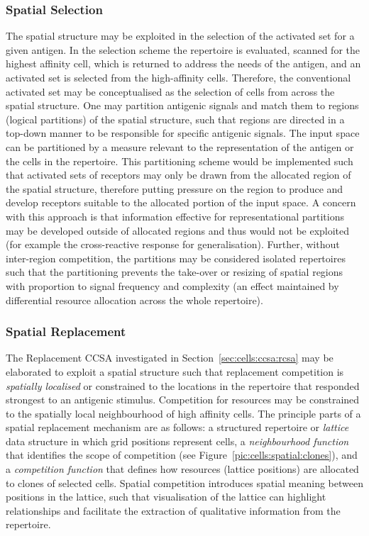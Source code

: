 %
%
\subsubsection{Spatial Selection}
The spatial structure may be exploited in the selection of the activated set for a given antigen. In the selection scheme the repertoire is evaluated, scanned for the highest affinity cell, which is returned to address the needs of the antigen, and an activated set is selected from the high-affinity cells. Therefore, the conventional activated set may be conceptualised as the selection of cells from across the spatial structure. 
One may partition antigenic signals and match them to regions (logical partitions) of the spatial structure, such that regions are directed in a top-down manner to be responsible for specific antigenic signals. The input space can be partitioned by a measure relevant to the representation of the antigen or the cells in the repertoire. This partitioning scheme would be implemented such that activated sets of receptors may only be drawn from the allocated region of the spatial structure, therefore putting pressure on the region to produce and develop receptors suitable to the allocated portion of the input space. A concern with this approach is that information effective for representational partitions may be developed outside of allocated regions and thus would not be exploited (for example the cross-reactive response for generalisation). Further, without inter-region competition, the partitions may be considered isolated repertoires such that the partitioning prevents the take-over or resizing of spatial regions with proportion to signal frequency and complexity (an effect maintained by differential resource allocation across the whole repertoire). 

%
%
\subsubsection{Spatial Replacement}
The Replacement CCSA investigated in Section~\ref{sec:cells:ccsa:rcsa} may be elaborated to exploit a spatial structure such that replacement competition is \emph{spatially localised} or constrained to the locations in the repertoire that responded strongest to an antigenic stimulus. Competition for resources may be constrained to the spatially local neighbourhood of high affinity cells. The principle parts of a spatial replacement mechanism are as follows: a structured repertoire or \emph{lattice} data structure in which grid positions represent cells, a \emph{neighbourhood function} that identifies the scope of competition (see Figure~\ref{pic:cells:spatial:clones}), and a \emph{competition function} that defines how resources (lattice positions) are allocated to clones of selected cells.
Spatial competition introduces spatial meaning between positions in the lattice, such that visualisation of the lattice can highlight relationships and facilitate the extraction of qualitative information from the repertoire. 

